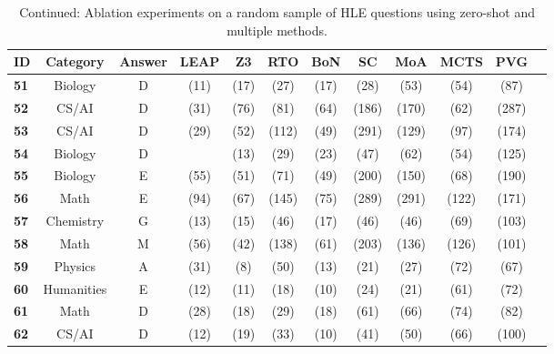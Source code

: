 \begin{table*}[htb]
\caption{Continued: Ablation experiments on a random sample of HLE questions using zero-shot and multiple methods.}
\label{tab:HLEeval}
\begin{center}
\begin{tiny}
\begin{tabular}{l|c|c|ccccccccc}
\toprule
{\bf ID} & {\bf Category} & {\bf Answer} &{\bf LEAP} & {\bf Z3} & {\bf RTO} & {\bf BoN} & {\bf SC} & {\bf MoA} & {\bf MCTS} & {\bf PVG} \\
\midrule
\textbf{51} & Biology & D  & \X [A] (11) & \X [A] (17) & \X [A] (27) & \X [A] (17) & \X [A] (28) & \X [A] (53) & \C [D] (54) & \X (87)\\
\textbf{52} & CS/AI & D  & \X [A] (31) & \X [E] (76) & \X [A] (81) & \X [C] (64) & \X [C] (186) & \X [C] (170) & \X (62) & \X (287)\\
\textbf{53} & CS/AI & D  & \X [E] (29) & \X [E] (52) & \X (112) & \X [E] (49) & \X (291) & \X [E] (129) & \X [E] (97) & \X [E] (174)\\
\textbf{54} & Biology & D  & \X [E]  & \X [E] (13) & \X [E] (29) & \X [E] (23) & \X [E] (47) & \C [D] (62) & \X [E] (54) & \X [C] (125)\\
\textbf{55} & Biology & E  & \X [A] (55) & \X [D] (51) & \X [C] (71) & \X [D] (49) & \X [D] (200) & \X (150) & \X [D] (68) & \X (190)\\
\textbf{56} & Math & E  & \C [E] (94) & \X (67) & \X (145) & \C [E] (75) & \X [F] (289) & \X [F] (291) & \C [E] (122) & \X [A] (171)\\
\textbf{57} & Chemistry & G  & \X [C] (13) & \X [E] (15) & \X (46) & \X [C] (17) & \C [G] (46) & \X [C] (46) & \X [C] (69) & \X (103)\\
\textbf{58} & Math & M  & \X (56) & \X [Q] (42) & \X (138) & \X [Y] (61) & \X [O] (203) & \X [Z] (136) & \X [Q] (126) & \X [Y] (101)\\
\textbf{59} & Physics & A  & \C [A] (31) & \X [E] (8) & \X (50) & \C [A] (13) & \C [A] (21) & \C [A] (27) & \C [A] (72) & \X (67)\\
\textbf{60} & Humanities & E  & \X [B] (12) & \X [B] (11) & \C [E] (18) & \X [B] (10) & \X [B] (24) & \X [C] (21) & \X [C] (61) & \X [B] (72)\\
\textbf{61} & Math & D  & \X [C] (28) & \X [E] (18) & \X [B] (29) & \X [B] (18) & \X [C] (61) & \X [B] (66) & \X [C] (74) & \X (82)\\
\textbf{62} & CS/AI & D  & \X [B] (12) & \X [B] (19) & \X (33) & \X [B] (10) & \X [B] (41) & \X [B] (50) & \X [B] (66) & \X [B] (100)\\

\end{tabular}
\end{tiny}
\end{center}
\end{table*}
